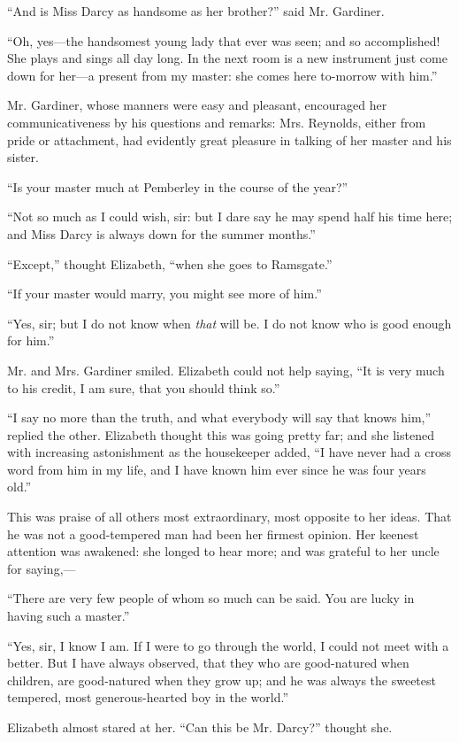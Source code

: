``And is Miss Darcy as handsome as her brother?'' said Mr. Gardiner.

``Oh, yes---the handsomest young lady that ever was seen; and so accomplished! She plays and sings all day long. In the next room is a new instrument just come down for her---a present from my master: she comes here to-morrow with him.''

Mr. Gardiner, whose manners were easy and pleasant, encouraged her communicativeness by his questions and remarks: Mrs. Reynolds, either from pride or attachment, had evidently great pleasure in talking of her master and his sister.

``Is your master much at Pemberley in the course of the year?''

``Not so much as I could wish, sir: but I dare say he may spend half his time here; and Miss Darcy is always down for the summer months.''

``Except,'' thought Elizabeth, ``when she goes to Ramsgate.''

``If your master would marry, you might see more of him.''

``Yes, sir; but I do not know when \textit{that} will be. I do not know who is good enough for him.''

Mr. and Mrs. Gardiner smiled. Elizabeth could not help saying, ``It is very much to his credit, I am sure, that you should think so.''

``I say no more than the truth, and what everybody will say that knows him,'' replied the other. Elizabeth thought this was going pretty far; and she listened with increasing astonishment as the housekeeper added, ``I have never had a cross word from him in my life, and I have known him ever since he was four years old.''

This was praise of all others most extraordinary, most opposite to her ideas. That he was not a good-tempered man had been her firmest opinion. Her keenest attention was awakened: she longed to hear more; and was grateful to her uncle for saying,---

``There are very few people of whom so much can be said. You are lucky in having such a master.''

``Yes, sir, I know I am. If I were to go through the world, I could not meet with a better. But I have always observed, that they who are good-natured when children, are good-natured when they grow up; and he was always the sweetest tempered, most generous-hearted boy in the world.''

Elizabeth almost stared at her. ``Can this be Mr. Darcy?'' thought she.

